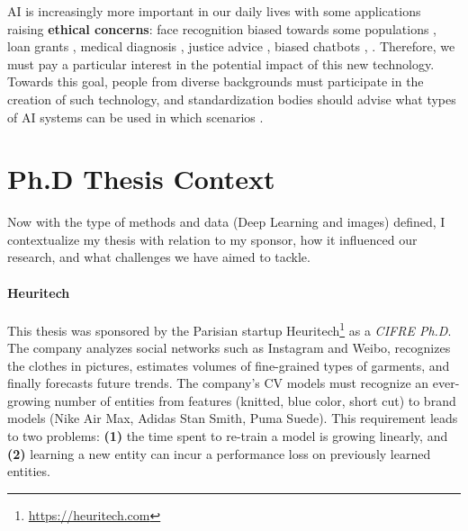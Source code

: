 \ac{AI} is increasingly more important in our daily lives with some applications raising
\textbf{ethical concerns}: face recognition biased towards some populations
\citep{grother2019facerecoethic}, loan grants \citep{anglekar2021loangrantml}, medical diagnosis
\citep{lazzazabal2020medicalbias}, justice advice \citep{russel2020justicefairness}, biased chatbots
\citep{sheng2019lmbias}, \etc. Therefore, we must pay a particular interest in the potential impact
of this new technology. Towards this goal, people from diverse backgrounds must participate in the
creation of such technology, and standardization bodies \citep{tommasi2021fairness} should advise
what types of \ac{AI} systems can be used in which scenarios \citep{gebru2019aiethichandbook}.

\section{Ph.D Thesis Context}

Now with the type of methods and data (Deep Learning and images) defined, I contextualize my
thesis with relation to my sponsor, how it influenced our research, and what challenges we have aimed to tackle.

\paragraph{Heuritech} This thesis was sponsored by the Parisian startup
Heuritech\footnote{\url{https://heuritech.com}} as a \textit{CIFRE Ph.D}. The company analyzes social
networks such as Instagram and Weibo, recognizes the clothes in pictures, estimates
volumes of fine-grained types of garments, and finally forecasts future trends. The company's
\acf{CV} models must recognize an ever-growing number of entities from features (\eg knitted, blue
color, short cut) to brand models (\eg Nike Air Max, Adidas Stan Smith, Puma Suede). This
requirement leads to two problems: \textbf{(1)} the time spent to re-train a model is growing
linearly, and \textbf{(2)} learning a new entity can incur a performance loss on previously learned
entities.

